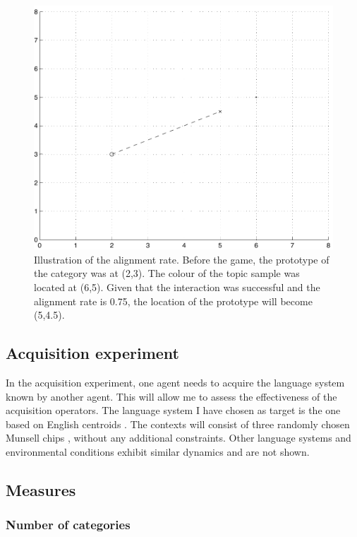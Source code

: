 \begin{figure}[htbp]
  \begin{center}
    \includegraphics[width=.55\textwidth]{./basic-operators/figures/alignment-rate.pdf}
    \caption[Illustration of the alignment rate]{Illustration of the
      alignment rate. Before the game, the prototype of the category
      was at (2,3). The colour of the topic sample was located at
      (6,5). Given that the interaction was successful and the
      alignment rate is 0.75, the location of the prototype will
      become (5,4.5).}
    \label{f:alignment-rate}
  \end{center}
\end{figure}

\subsection{Acquisition experiment}

In the acquisition experiment, one agent needs to acquire the language
system known by another agent. This will allow me to assess the
effectiveness of the acquisition operators. The language system I have
chosen as target is the one based on English centroids
\citep{sturges95location}. The contexts will consist of three randomly
chosen Munsell chips \citep{newhall42final}, without any additional
constraints. Other language systems and environmental conditions
exhibit similar dynamics and are not shown.

\subsection{Measures}

\subsubsection{Number of categories}

